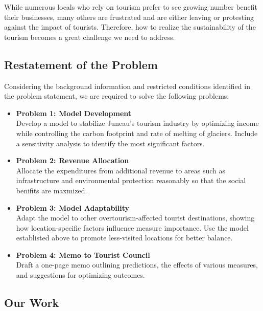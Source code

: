 \documentclass{mcmthesis}
\begin{document}
While numerous locals who rely on tourism prefer to see growing number benefit their businesses, many others are frustrated and are either leaving or protesting against the impact of tourists. 
Therefore, how to realize the sustainability of the tourism becomes a great challenge we need to address.

\subsection{Restatement of the Problem}
Considering the background information and restricted conditions identified in the problem statement, we are required to solve the following problems:
\begin{itemize}
  \item \textbf{Problem 1: Model Development} \\
    Develop a model to stabilize Juneau's tourism industry by optimizing income while controlling the carbon footprint and rate of melting of glaciers. 
    Include a sensitivity analysis to identify the most significant factors.
    
  \item \textbf{Problem 2: Revenue Allocation} \\
    Allocate the expenditures from additional revenue to areas such as infrastructure and environmental protection reasonably so that the social benifits are maxmized.
    
  \item \textbf{Problem 3: Model Adaptability} \\
    Adapt the model to other overtourism-affected tourist destinations, showing how location-specific factors influence measure importance. 
    Use the model establisted above to promote less-visited locations for better balance.
    
  \item \textbf{Problem 4: Memo to Tourist Council} \\
    Draft a one-page memo outlining predictions, the effects of various measures, and suggestions for optimizing outcomes.
\end{itemize}


\subsection{Our Work}
\end{document}
